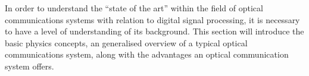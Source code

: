 In order to understand the ``state of the art'' within the field of optical
communications systems with relation to digital signal processing, it is
necessary to have a level of understanding of its background. This section will
introduce the basic physics concepts, an generalised overview of a typical
optical communications system, along with the advantages an optical
communication system offers.
